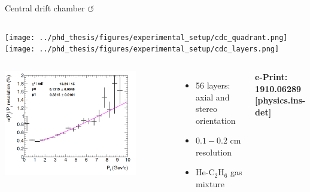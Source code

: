 \documentclass[xcolor=dvipsnames]{beamer}
\begin{document}
\begin{frame}{Central drift chamber \hyperlink{frame:A}{$\circlearrowleft$}}
   \centering\scriptsize
   \begin{columns}
      \centering
      \texttt{[image: ../phd\_thesis/figures/experimental\_setup/cdc\_quadrant.png]}
      \centering
      \texttt{[image: ../phd\_thesis/figures/experimental\_setup/cdc\_layers.png]}
   \end{columns}

   \begin{columns}
      \centering
         \includegraphics[width=0.8\textwidth]{figures/cdc_resolution.png}
      \begin{itemize}
         \item 56 layers: axial and stereo orientation
         \item $0.1-0.2$ cm resolution
         \item He-C$_2$H$_6$ gas mixture
      \end{itemize}

      \begin{flushright}
        \tiny \textbf{e-Print: 1910.06289 [physics.ins-det]}
      \end{flushright}
      
   \end{columns}


\end{frame}
\end{document}
